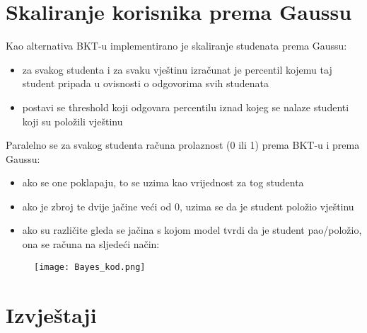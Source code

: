 	\section{Skaliranje korisnika prema Gaussu}
		Kao alternativa BKT-u implementirano je skaliranje studenata prema Gaussu:
	\begin{itemize}
		\item za svakog studenta i za svaku vještinu izračunat je percentil kojemu taj student pripada u ovisnosti o odgovorima svih studenata
		\item postavi se threshold koji odgovara percentilu iznad kojeg se nalaze studenti koji su položili vještinu\newline
	\end{itemize}
		Paralelno se za svakog studenta računa prolaznost (0 ili 1) prema BKT-u i prema Gaussu:
	\begin{itemize}
		\item ako se one poklapaju, to se uzima kao vrijednost za tog studenta
		\item ako je zbroj te dvije jačine veći od 0, uzima se da je student položio vještinu
		\item ako su različite gleda se jačina s kojom model tvrdi da je student pao/položio, ona se računa na sljedeći način:
	\end{itemize}
	\begin{figure}[!htb]
		\centering
		\texttt{[image: Bayes\_kod.png]}
		\caption{}
		\label{}
	\end{figure}
		
	\section{Izvještaji}
